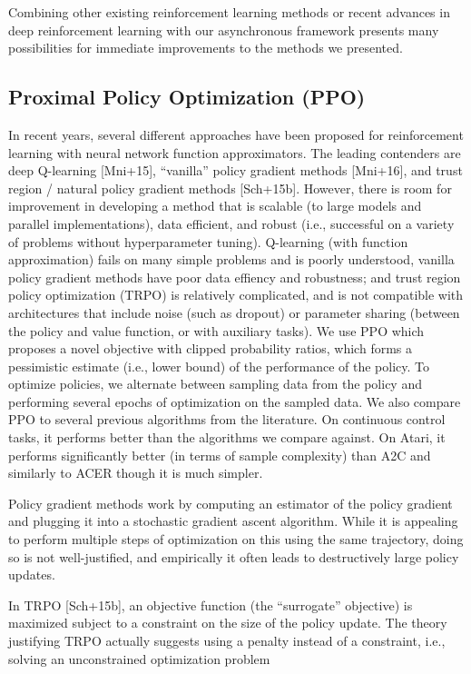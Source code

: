 \documentclass[conference]{IEEEtran}
\begin{document}
Combining other existing reinforcement learning methods or recent advances in deep reinforcement learning
with our asynchronous framework presents many possibilities for immediate improvements to the methods we presented.

\subsection{\textbf{Proximal Policy Optimization (PPO)}}

In recent years, several different approaches have been proposed for reinforcement learning with neural network function approximators. The leading contenders are deep Q-learning [Mni+15], “vanilla” policy gradient methods [Mni+16], and trust region / natural policy gradient methods [Sch+15b]. However, there is room for improvement in developing a method that is scalable (to large models and parallel implementations), data efficient, and robust (i.e., successful on a variety of problems without hyperparameter tuning). Q-learning (with function approximation) fails on many simple problems and is poorly understood, vanilla policy gradient methods have poor data effiency and robustness; and trust region policy optimization (TRPO) is relatively complicated, and is not compatible with architectures that include noise (such as dropout) or parameter sharing (between the policy and value function, or with auxiliary tasks). We use PPO which proposes a novel objective with clipped probability ratios, which forms a pessimistic estimate (i.e., lower bound) of the performance of the policy. To optimize policies, we alternate between sampling data from the policy and performing several epochs of optimization on the sampled data. We also compare PPO to several previous algorithms from the literature. On continuous control tasks, it performs better than the algorithms we compare against. On Atari, it performs significantly better (in terms of sample complexity) than A2C and similarly to ACER though it is much simpler.

Policy gradient methods work by computing an estimator of the policy gradient and plugging it into a stochastic gradient ascent algorithm. While it is appealing to perform multiple steps of optimization on this using the same trajectory, doing so is not well-justified, and empirically it often leads to destructively large policy updates.

In TRPO [Sch+15b], an objective function (the “surrogate” objective) is maximized subject to a constraint on the size of the policy update. The theory justifying TRPO actually suggests using a penalty instead of a constraint, i.e., solving an unconstrained optimization problem
\end{document}
